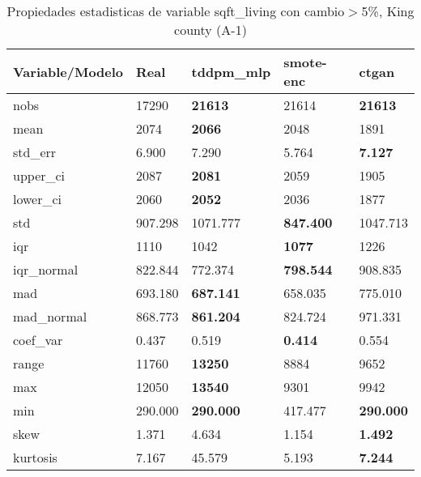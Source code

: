 \begin{table}[H]
\centering
\fontsize{8}{14}\selectfont
\caption{Propiedades estadisticas de variable sqft\_living con cambio\ensuremath{>}5\%, King county (A-1)}
\label{table-stats-king county-a-1-sqft_living-short}
\begin{tabular}{|l|m{10em}|m{10em}|m{10em}|m{10em}|}
\hline
 \rowcolor[gray]{0.8}
Variable/Modelo & Real & tddpm\_mlp & smote-enc & ctgan \\
\hline nobs & 17290 & \bfseries 21613 & \cellcolor[rgb]{0.9, 0.54, 0.52} 21614 & \bfseries 21613 \\
\hline mean & 2074 & \bfseries 2066 & 2048 & \cellcolor[rgb]{0.9, 0.54, 0.52} 1891 \\
\hline std\_err & 6.900 & 7.290 & \cellcolor[rgb]{0.9, 0.54, 0.52} 5.764 & \bfseries 7.127 \\
\hline upper\_ci & 2087 & \bfseries 2081 & 2059 & \cellcolor[rgb]{0.9, 0.54, 0.52} 1905 \\
\hline lower\_ci & 2060 & \bfseries 2052 & 2036 & \cellcolor[rgb]{0.9, 0.54, 0.52} 1877 \\
\hline std & 907.298 & \cellcolor[rgb]{0.9, 0.54, 0.52} 1071.777 & \bfseries 847.400 & 1047.713 \\
\hline iqr & 1110 & 1042 & \bfseries 1077 & \cellcolor[rgb]{0.9, 0.54, 0.52} 1226 \\
\hline iqr\_normal & 822.844 & 772.374 & \bfseries 798.544 & \cellcolor[rgb]{0.9, 0.54, 0.52} 908.835 \\
\hline mad & 693.180 & \bfseries 687.141 & 658.035 & \cellcolor[rgb]{0.9, 0.54, 0.52} 775.010 \\
\hline mad\_normal & 868.773 & \bfseries 861.204 & 824.724 & \cellcolor[rgb]{0.9, 0.54, 0.52} 971.331 \\
\hline coef\_var & 0.437 & 0.519 & \bfseries 0.414 & \cellcolor[rgb]{0.9, 0.54, 0.52} 0.554 \\
\hline range & 11760 & \bfseries 13250 & \cellcolor[rgb]{0.9, 0.54, 0.52} 8884 & 9652 \\
\hline max & 12050 & \bfseries 13540 & \cellcolor[rgb]{0.9, 0.54, 0.52} 9301 & 9942 \\
\hline min & 290.000 & \bfseries 290.000 & \cellcolor[rgb]{0.9, 0.54, 0.52} 417.477 & \bfseries 290.000 \\
\hline skew & 1.371 & \cellcolor[rgb]{0.9, 0.54, 0.52} 4.634 & 1.154 & \bfseries 1.492 \\
\hline kurtosis & 7.167 & \cellcolor[rgb]{0.9, 0.54, 0.52} 45.579 & 5.193 & \bfseries 7.244 \\

\end{tabular}
\end{table}
